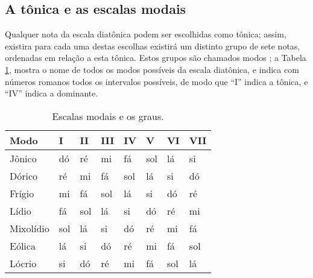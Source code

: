 \subsection{A tônica e as escalas modais}
Qualquer nota da escala diatônica podem ser escolhidas como tônica;
assim, existira para cada uma destas escolhas existirá um distinto grupo de sete notas,
ordenadas em relação a esta tônica. Estos grupos são chamados modos \cite[pp. 21]{holst1998abc};
a Tabela \ref{tab:modosdiatonica}, mostra o nome de todos os modos possíveis da escala diatônica,
e indica com números romanos todos os intervalos possíveis,
de modo que ``I'' indica a tônica, e ``IV'' indica a dominante.

\begin{table}[h]
  \centering
  \begin{tabular}{|l||l|l|l|l|l|l|l|}
  \hline
  Modo      & I   & II  & III & IV  & V   & VI  & VII \\ \hline \hline
  Jônico    & dó  & ré  & mi  & fá  & sol & lá  & si  \\ \hline
  Dórico    & ré  & mi  & fá  & sol & lá  & si  & dó  \\ \hline
  Frígio    & mi  & fá  & sol & lá  & si  & dó  & ré  \\ \hline
  Lídio     & fá  & sol & lá  & si  & dó  & ré  & mi  \\ \hline
  Mixolídio & sol & lá  & si  & dó  & ré  & mi  & fá  \\ \hline
  Eólica    & lá  & si  & dó  & ré  & mi  & fá  & sol \\ \hline
  Lócrio    & si  & dó  & ré  & mi  & fá  & sol & lá  \\ \hline
  \end{tabular}
  \caption{Escalas modais e os graus.}
  \label{tab:modosdiatonica}
\end{table}

